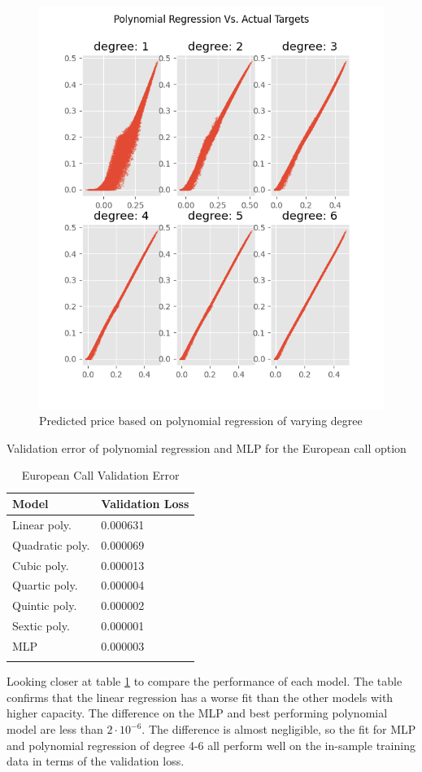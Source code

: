 \begin{figure}[H]
\centering
\includegraphics{Figures/polynomialEuroC.png}
\decoRule
\caption[Polynomial Regression Predictions Vs. Actual Prices]{Predicted price based on polynomial regression of varying degree}
\label{fig:PolynomialEuroC}
\end{figure}

\begin{table}[th]
\caption{European Call Validation Error}{Validation error of polynomial regression and MLP for the European call option}
\label{tab:euroPerformance}
\centering
\begin{tabular}{l l}
\toprule
\textbf{Model} & \textbf{Validation Loss} \\
\midrule
Linear  poly. & 0.000631 \\
Quadratic poly.  & 0.000069 \\
Cubic poly. & 0.000013\\
Quartic poly.  & 0.000004 \\
Quintic poly.  & 0.000002 \\
Sextic poly. & 0.000001\\
MLP        & 0.000003\\
\bottomrule\\
\end{tabular}
\end{table}
Looking closer at table \ref{tab:euroPerformance} to compare the performance of each model. The table confirms that the linear regression has a worse fit than the other models with higher capacity. The difference on the MLP and best performing polynomial model are less than $2\cdot 10^{-6}$. The difference is almost negligible, so the fit for MLP and polynomial regression of degree 4-6 all perform well on the in-sample training data in terms of the validation loss.

